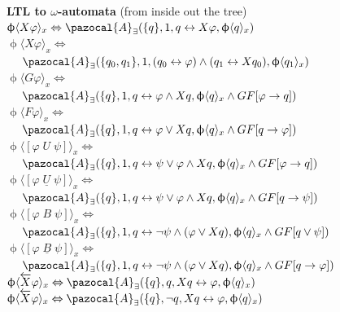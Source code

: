 \documentclass{article}
\newcommand{\Ab}{\pazocal{A}}
\begin{document}
\begin{multicols}{4}
\textbf{LTL to $\omega$-automata} (from inside out the tree)
$\upphi \langle X \varphi\rangle_x \Leftrightarrow \Ab_\exists (\{q\},1,q \leftrightarrow X \varphi, \upphi \langle q \rangle_x)$\\
$\upphi \langle X \varphi\rangle_x \Leftrightarrow $ \\
$\ \ \ \ \Ab_\exists (\{q_0,q_1\},1,(q_0 \leftrightarrow \varphi) \wedge (q_1 \leftrightarrow X q_0), \upphi \langle q_1 \rangle_x)$ \\
$\upphi \langle G \varphi\rangle_x \Leftrightarrow $ \\
$\ \ \ \ \Ab_\exists (\{q\},1,q \leftrightarrow \varphi \wedge X q,\upphi \langle q \rangle_x \wedge GF[\varphi \rightarrow q])$ \\
$\upphi \langle F \varphi\rangle_x \Leftrightarrow$ \\
$\ \ \ \ \Ab_\exists (\{q\},1,q \leftrightarrow \varphi \vee X q, \upphi \langle q \rangle_x \wedge GF[q \rightarrow \varphi])$ \\
$\upphi \langle [\varphi\; U \; \psi] \rangle_x \Leftrightarrow$ \\
$\ \ \ \ \Ab_\exists (\{q\},1,q \leftrightarrow \psi \vee \varphi \wedge X q, \upphi \langle q \rangle_x \wedge GF[\varphi \rightarrow q])$ \\
$\upphi \langle [\varphi\; \underline{U} \; \psi] \rangle_x \Leftrightarrow$ \\
$\ \ \ \ \Ab_\exists (\{q\},1,q \leftrightarrow \psi \vee \varphi \wedge X q, \upphi \langle q \rangle_x \wedge GF[q \rightarrow \psi])$ \\
$\upphi \langle [\varphi\; B \; \psi] \rangle_x \Leftrightarrow$ \\
$\ \ \ \ \Ab_\exists (\{q\},1,q \leftrightarrow \neg\psi \wedge (\varphi \vee X q), \upphi \langle q \rangle_x \wedge GF[q \vee \psi])$ \\
$\upphi \langle [\varphi\; \underline{B} \; \psi] \rangle_x \Leftrightarrow$ \\
$\ \ \ \ \Ab_\exists (\{q\},1,q \leftrightarrow \neg\psi \wedge (\varphi \vee X q), \upphi \langle q \rangle_x \wedge GF[q \rightarrow \varphi])$ \\
$\upphi \langle \overleftarrow{X} \varphi\rangle_x \Leftrightarrow \Ab_\exists (\{q\},q, Xq \leftrightarrow \varphi, \upphi \langle q \rangle_x)$\\
$\upphi \langle \overleftarrow{X} \varphi\rangle_x \Leftrightarrow \Ab_\exists (\{q\},\neg q, Xq \leftrightarrow \varphi, \upphi \langle q \rangle_x)$\\

\end{multicols}
\end{document}
